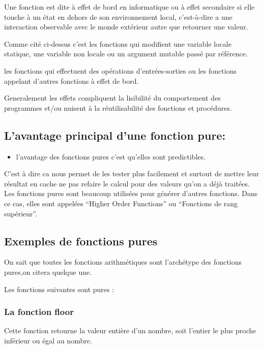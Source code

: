 \documentclass[12pt,titlepage]{article}
\begin{document}
Une fonction est dite à effet de bord en informatique ou à effet secondaire si elle touche à un état en dehors de son environnement local, c'est-à-dire a une interaction observable avec le monde extérieur autre que retourner une valeur.

Comme cité ci-dessus c'est les fonctions qui modifient une variable locale statique, une variable non locale ou un argument mutable passé par référence.

les fonctions qui effectuent des opérations d'entrées-sorties ou les fonctions appelant d'autres fonctions à effet de bord.

Generalement les effets compliquent la lisibilité du comportement des programmes et/ou nuisent à la réutilisabilité des fonctions et procédures.\cite{effetdebord}

\subsection{L’avantage principal d'une fonction pure:}

\begin{itemize}
	\item l'avantage des fonctions pures c'est qu'elles sont predictibles.
\end{itemize}

C'est à dire ca nous permet de les tester plus facilement et surtout de mettre leur résultat en cache ne pas refaire le calcul pour des valeurs qu’on a déjà traitées.
Les fonctions pures sont beaucoup utilisées pour générer d’autres fonctions. Dans ce cas, elles sont appelées “Higher Order Functions” ou “Fonctions de rang supérieur”.\cite{avantage}

\subsection{Exemples de fonctions pures }

On sait que toutes les fonctions arithmétiques sont l'archétype des fonctions pures,on citera quelque une.\cite{exemplefctpure}

Les fonctions  suivantes sont pures :


\subsubsection{La fonction floor}

Cette fonction retourne la valeur entière d'un nombre, soit l'entier le plus proche inférieur ou égal au nombre.
\end{document}
